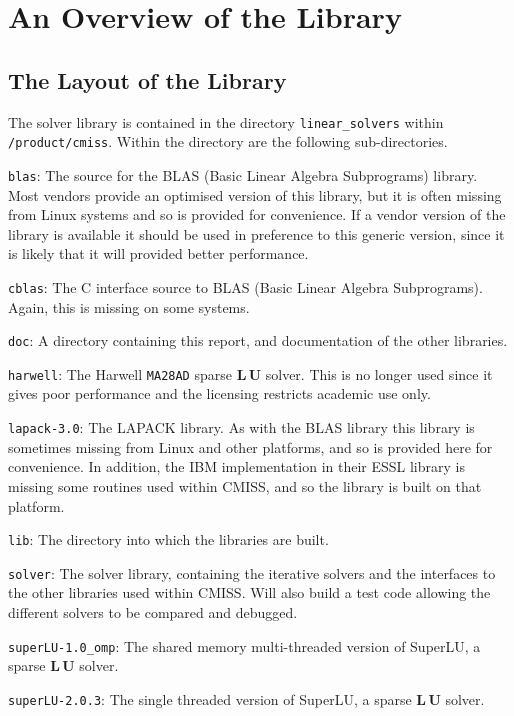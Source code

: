 
\section{An Overview of the Library}\label{s5.0}

\subsection{The Layout of the Library}\label{s5.1}

The solver library is contained in the directory {\tt linear\_solvers} within
{\tt /product/cmiss}. Within the directory are the following sub-directories.

{\tt blas}:
The source for the BLAS (Basic Linear Algebra Subprograms) library.
Most vendors provide an optimised version of this library, but it is often 
missing from Linux systems and so is provided for convenience. If a vendor 
version of the library is available it should be used in preference to this 
generic version, since it is likely that it will provided better performance.

{\tt cblas}:
The C interface source to BLAS (Basic Linear Algebra Subprograms).
Again, this is missing on some systems.

{\tt doc}:
A directory containing this report, and documentation of the other libraries.

{\tt harwell}:
The Harwell {\tt MA28AD} sparse $\mathbf{L \, U}$ solver. This is
no longer used since it gives poor performance and the licensing restricts 
academic use only.

{\tt lapack-3.0}:
The LAPACK library. As with the BLAS library this library is
sometimes missing from Linux and other platforms, and so is provided here for 
convenience. In addition, the IBM implementation in their ESSL library is
missing some routines used within CMISS, and so the library is built on that 
platform.

{\tt lib}:
The directory into which the libraries are built. 

{\tt solver}:
The solver library, containing the iterative solvers and the interfaces to the
other libraries used within CMISS. Will also build a test code allowing the
different solvers to be compared and debugged.

{\tt superLU-1.0\_omp}:
The shared memory multi-threaded version of SuperLU, a sparse $\mathbf{L \, U}$
solver. 

{\tt superLU-2.0.3}:
The single threaded version of SuperLU, a sparse $\mathbf{L \, U}$ solver. 

